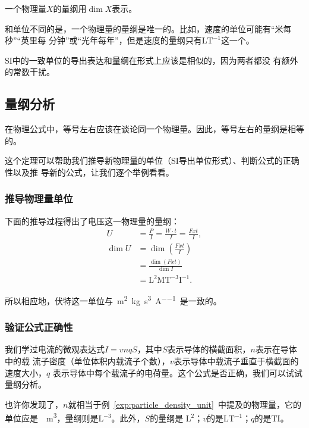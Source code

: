 一个物理量$X$的量纲用$\dim X$表示。

和单位不同的是，一个物理量的量纲是唯一的。比如，速度的单位可能有“米每秒”“英里每
分钟”或“光年每年”，但是速度的量纲只有$\mathrm{LT^{-1}}$这一个。

SI中的一致单位的导出表达和量纲在形式上应该是相似的，因为两者都没
有额外的常数干扰。

\subsection{量纲分析}

\begin{rawthm}
    在物理公式中，等号左右应该在谈论同一个物理量。因此，等号左右的量纲是相等的。
\end{rawthm}

这个定理可以帮助我们推导新物理量的单位（SI导出单位形式）、判断公式的正确性以及推
导新的公式，让我们逐个举例看看。

\subsubsection{推导物理量单位}

下面的推导过程得出了电压这一物理量的量纲：
\begin{align*}
    U &= \frac{P}{I} = \frac{W\cdot t}{I} = \frac{Fxt}{I},\\
    \dim U &= \dim \left( \frac{Fxt}{I} \right) \\
                      &= \frac{\dim (Fxt)}{\dim I} \\
                      &= \mathrm{L^2MT^{-3}I^{-1}}
.\end{align*} 

所以相应地，伏特这一单位与~\unit{\square\m\kg\per\cubic\s\per\A}~是一致的。

\subsubsection{验证公式正确性}

我们学过电流的微观表达式$I=vnqS$，其中$S$表示导体的横截面积，$n$表示在导体中的载
流子密度（单位体积内载流子个数），$v$表示导体中载流子垂直于横截面的速度大小，$q$
表示导体中每个载流子的电荷量。这个公式是否正确，我们可以试试量纲分析。

也许你发现了，$n$就相当于例~\ref{exp:particle_density_unit}~中提及的物理量，它的
单位应是~\unit{\per\cubic\meter}，量纲则是$\mathrm{L^{-3}}$。此外，$S$的量纲是
$\mathrm{L^2}$；$v$的是$\mathrm{LT^{-1}}$；$q$的是$\mathrm{TI}$。

